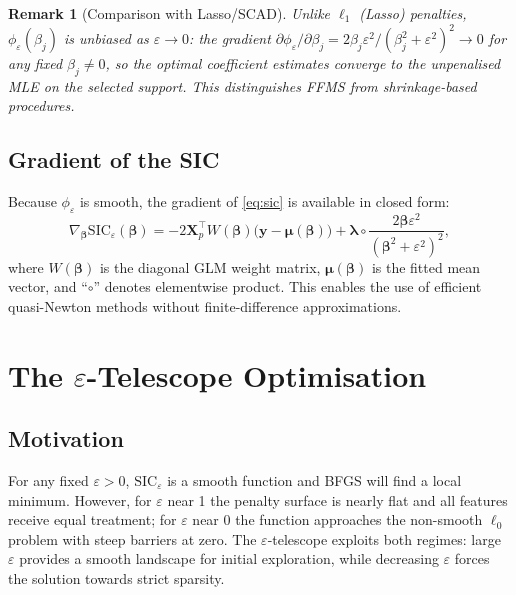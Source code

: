 \documentclass[12pt,a4paper]{article}
\newtheorem{remark}{Remark}
\newcommand{\bbet}{\bm{\beta}}
\newcommand{\blam}{\bm{\lambda}}
\newcommand{\SIC}{\mathrm{SIC}}
\newcommand{\bX}{\mathbf{X}}
\newcommand{\by}{\mathbf{y}}
\begin{document}
\begin{remark}[Comparison with Lasso/SCAD]
  Unlike $\ell_1$ (Lasso) penalties, $\phi_\varepsilon(\beta_j)$ is
  \emph{unbiased} as $\varepsilon\to 0$: the gradient
  $\partial\phi_\varepsilon/\partial\beta_j = 2\beta_j\varepsilon^2/
  (\beta_j^2+\varepsilon^2)^2 \to 0$ for any fixed $\beta_j\neq 0$,
  so the optimal coefficient estimates converge to the unpenalised MLE on the
  selected support.  This distinguishes FFMS from shrinkage-based procedures.
\end{remark}

\subsection{Gradient of the SIC}

Because $\phi_\varepsilon$ is smooth, the gradient of \eqref{eq:sic} is
available in closed form:
\begin{equation}
  \nabla_{\bbet}\SIC_\varepsilon(\bbet)
  = -2\bX_p^\top W(\bbet)\bigl(\by - \bm\mu(\bbet)\bigr)
  + \blam \circ \frac{2\bbet\varepsilon^2}{(\bbet^2+\varepsilon^2)^2},
  \label{eq:sic_grad}
\end{equation}
where $W(\bbet)$ is the diagonal GLM weight matrix, $\bm\mu(\bbet)$ is the
fitted mean vector, and ``$\circ$'' denotes elementwise product.  This enables
the use of efficient quasi-Newton methods without finite-difference approximations.

\section{The \texorpdfstring{$\varepsilon$}{epsilon}-Telescope Optimisation}
\label{sec:optim}

\subsection{Motivation}

For any fixed $\varepsilon > 0$, $\SIC_\varepsilon$ is a smooth function and
BFGS will find a local minimum.  However, for $\varepsilon$ near 1 the penalty
surface is nearly flat and all features receive equal treatment; for $\varepsilon$
near 0 the function approaches the non-smooth $\ell_0$ problem with steep
barriers at zero.  The $\varepsilon$-telescope exploits both regimes: large
$\varepsilon$ provides a smooth landscape for initial exploration, while
decreasing $\varepsilon$ forces the solution towards strict sparsity.
\end{document}
